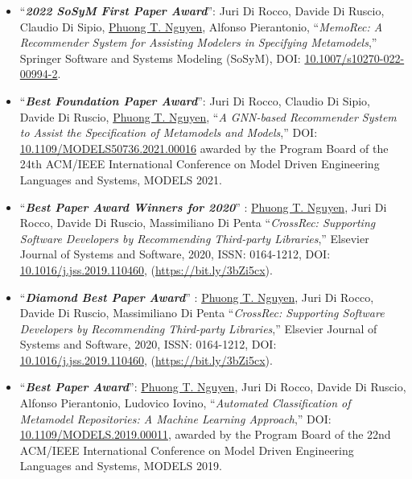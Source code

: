 \documentclass[a4paper,9pt]{article} %
\begin{document}
\begin{itemize}
	
	
	\item ``\textbf{\emph{2022 SoSyM First Paper Award}}'': Juri Di Rocco, Davide Di Ruscio, Claudio Di Sipio, \underline{Phuong T. Nguyen}, Alfonso Pierantonio, ``\emph{MemoRec: A Recommender System for Assisting Modelers in Specifying Metamodels},'' Springer Software and Systems Modeling (SoSyM), DOI: \href{https://doi.org/10.1007/s10270-022-00994-2}{10.1007/s10270-022-00994-2}.
		
    \item ``\textbf{\emph{Best Foundation Paper Award}}'': Juri Di Rocco, Claudio Di Sipio, Davide Di Ruscio, \underline{Phuong T. Nguyen}, ``\emph{A GNN-based Recommender System to Assist the Specification of Metamodels and Models},'' DOI: \href{https://doi.org/10.1109/MODELS50736.2021.00016}{10.1109/MODELS50736.2021.00016} awar\-ded by the Program Board of the 24th ACM/IEEE International Conference on Model Driven Engineering Languages and Systems, MODELS 2021. %
	
	\item ``\textbf{\emph{Best Paper Award Winners for 2020}}''%
	: \underline{Phuong T. Nguyen}, Juri Di Rocco, Davide Di Ruscio, Massimiliano Di Penta ``\emph{CrossRec: Supporting Software Developers by Recommending Third-party Libraries},'' Elsevier Journ\-al of Systems and Software, 2020, ISSN: 0164-1212, DOI: \href{https://doi.org/10.1016/j.jss.2019.110460}{10.1016/j.jss.2019.110460}, (\href{https://bit.ly/3bZi5cx}{https:\-//bit.ly/3bZi5cx}). %
	
	\item ``\textbf{\emph{Diamond Best Paper Award}}''%
	: \underline{Phuong T. Nguyen}, Juri Di Rocco, Davide Di Ruscio, Massimiliano Di Penta ``\emph{CrossRec: Supporting Software Developers by Recommending Third-party Libraries},'' Elsevier Journ\-al of Systems and Software, 2020, ISSN: 0164-1212, DOI: \href{https://doi.org/10.1016/j.jss.2019.110460}{10.1016/j.jss.2019.110460}, (\href{https://bit.ly/3bZi5cx}{https:\-//bit.ly/3bZi5cx}). %

    \item ``\textbf{\emph{Best Paper Award}}'': \underline{Phuong T. Nguyen}, Juri Di Rocco, Davide Di Ruscio, Alfonso Pierantonio, Ludovico Iovino, ``\emph{Automated Classification of Metamodel Repositories: A Machine Learning Approach},'' DOI: \href{https://doi.org/10.1109/MODELS.2019.00011}{10.1109/MODELS.2019.00011}, awar\-ded by the Program Board of the 22nd ACM/IEEE International Conference on Model Driven Engineering Languages and Systems, MODELS 2019.
    

\end{itemize}
\end{document}
